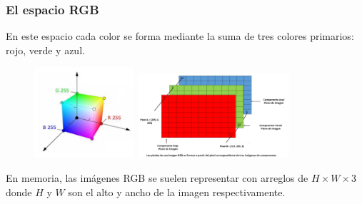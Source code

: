 \begin{frame}\frametitle{El espacio RGB}
  En este espacio cada color se forma mediante la suma de tres colores primarios: rojo, verde y azul. 
  \begin{figure}
    \centering
    \includegraphics[width=0.33\textwidth]{Figures/RGB_model.pdf}
    \includegraphics[width=0.5\textwidth]{Figures/rgb_pixels.png}
  \end{figure}
  En memoria, las imágenes RGB se suelen representar con arreglos de $H\times W \times 3$ donde $H$ y $W$ son el alto y ancho de la imagen respectivamente. 
\end{frame}

